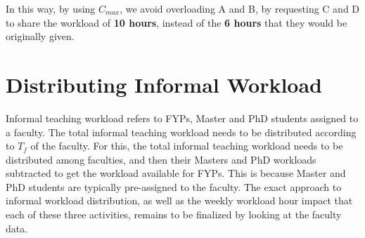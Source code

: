 In this way, by using \(C_{max}\), we avoid overloading A and B, by requesting C and D to share the workload of \textbf{10 hours}, instead of the \textbf{6 hours} that they would be originally given.

\section{Distributing Informal Workload}
Informal teaching workload refers to FYPs, Master and PhD students assigned to a faculty. The total informal teaching workload needs to be distributed according to \(T_f\) of the faculty. For this, the total informal teaching workload needs to be distributed among faculties, and then their Masters and PhD workloads subtracted to get the workload available for FYPs. This is because Master and PhD students are typically pre-assigned to the faculty. The exact approach to informal workload distribution, as well as the weekly workload hour impact that each of these three activities, remains to be finalized by looking at the faculty data.
